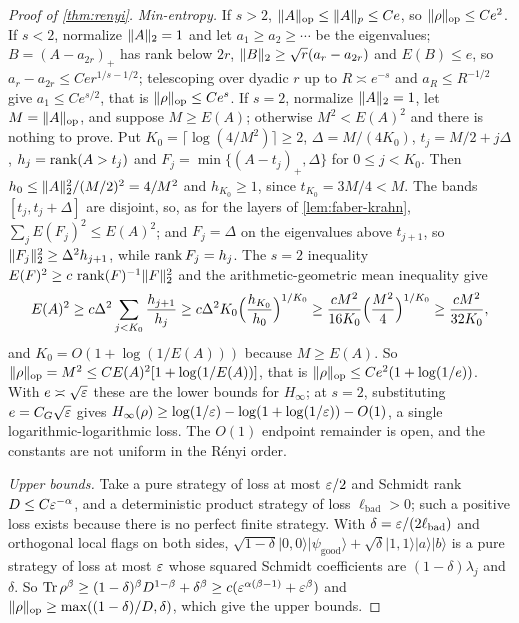 \begin{proof}[Proof of \cref{thm:renyi}]
\emph{Min-entropy.} If $s>2$, $\lVert A\rVert_{\mathrm{op}}\le\|A\|_p\le Ce$, so $\lVert \rho\rVert_{\mathrm{op}}\le Ce^2$. If $s<2$, normalize $\lVert A\rVert_2=1$ and let
$a_1\ge a_2\ge\cdots$ be the eigenvalues; $B=(A-a_{2r})_+$ has rank below $2r$, $\lVert B\rVert_2\ge\sqrt r(a_r-a_{2r})$ and $E(B)\le e$, so
$a_r-a_{2r}\le Cer^{1/s-1/2}$; telescoping over dyadic $r$ up to $R\asymp e^{-s}$ and $a_R\le R^{-1/2}$ give $a_1\le Ce^{s/2}$, that
is $\lVert \rho\rVert_{\mathrm{op}}\le Ce^s$. If $s=2$, normalize $\lVert A\rVert_2=1$, let $M=\lVert A\rVert_{\mathrm{op}}$, and suppose $M\ge E(A)$; otherwise $M^2<E(A)^2$ and there is
nothing to prove. Put $K_0=\lceil\log(4/M^2)\rceil\ge2$, $\Delta=M/(4K_0)$, $t_j=M/2+j\Delta$, $h_j=\operatorname{rank}(A>t_j)$ and
$F_j=\min\{(A-t_j)_+,\Delta\}$ for $0\le j<K_0$. Then $h_0\le\lVert A\rVert_2^2/(M/2)^2=4/M^2$ and $h_{K_0}\ge1$, since $t_{K_0}=3M/4<M$. The bands
$[t_j,t_j+\Delta]$ are disjoint, so, as for the layers of \cref{lem:faber-krahn}, $\sum_jE(F_j)^2\le E(A)^2$; and $F_j=\Delta$ on the
eigenvalues above $t_{j+1}$, so $\lVert F_j\rVert_2^2\ge\Delta^2h_{j+1}$, while $\operatorname{rank} F_j=h_j$. The $s=2$ inequality
$E(F)^2\ge c\,\operatorname{rank}(F)^{-1}\lVert F\rVert_2^2$ and the arithmetic-geometric mean inequality give
\[
E(A)^2\ge c\Delta^2\sum_{j<K_0}\frac{h_{j+1}}{h_j}\ge c\Delta^2K_0\Bigl(\frac{h_{K_0}}{h_0}\Bigr)^{1/K_0}\ge\frac{cM^2}{16K_0}\Bigl(\frac{M^2}4\Bigr)^{1/K_0}
\ge\frac{cM^2}{32K_0},
\]
and $K_0=O(1+\log(1/E(A)))$ because $M\ge E(A)$. So $\lVert \rho\rVert_{\mathrm{op}}=M^2\le CE(A)^2[1+\log(1/E(A))]$, that is $\lVert \rho\rVert_{\mathrm{op}}\le Ce^2(1+\log(1/e))$.
With $e\asymp\sqrt{\varepsilon}$ these are the lower bounds for $H_\infty$; at $s=2$, substituting $e=C_G\sqrt{\varepsilon}$ gives
$H_\infty(\rho)\ge\log(1/\varepsilon)-\log(1+\log(1/\varepsilon))-O(1)$, a single logarithmic-logarithmic loss. The $O(1)$ endpoint remainder is open,
and the constants are not uniform in the R\'enyi order.

\emph{Upper bounds.} Take a pure strategy of loss at most $\varepsilon/2$ and Schmidt rank $D\le C\varepsilon^{-\alpha}$, and a deterministic
product strategy of loss $\ell_{\mathrm{bad}}>0$; such a positive loss exists because there is no perfect finite strategy. With
$\delta=\varepsilon/(2\ell_{\mathrm{bad}})$ and orthogonal local flags on both sides, $\sqrt{1-\delta}|0,0\rangle|\psi_{\mathrm{good}}\rangle+\sqrt\delta|1,1\rangle|a\rangle|b\rangle$
is a pure strategy of loss at most $\varepsilon$ whose squared Schmidt coefficients are $(1-\delta)\lambda_j$ and $\delta$. So
$\operatorname{Tr}\rho^\beta\ge(1-\delta)^\beta D^{1-\beta}+\delta^\beta\ge c(\varepsilon^{\alpha(\beta-1)}+\varepsilon^\beta)$ and $\lVert \rho\rVert_{\mathrm{op}}\ge\max((1-\delta)/D,\delta)$, which
give the upper bounds.


\end{proof}
